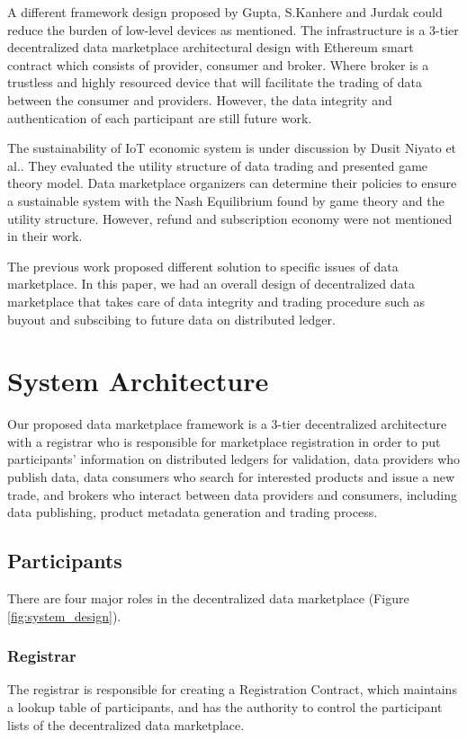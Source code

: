 \documentclass[journal,10pt,a4paper]{IEEEtran}
\begin{document}
A different framework design proposed by Gupta, S.Kanhere and Jurdak\cite{3tierDataMarket} could reduce the burden of low-level devices as mentioned. The infrastructure is a 3-tier decentralized data marketplace architectural design with Ethereum smart contract which consists of provider, consumer and broker. Where broker is a trustless and highly resourced device that will facilitate the trading of data between the consumer and providers. However, the data integrity and authentication of each participant are still future work.  

The sustainability of IoT economic system is under discussion by Dusit Niyato et al.\cite{UtilityStruct}. They evaluated the utility structure of data trading and presented game theory model.  Data marketplace organizers can determine their policies to ensure a sustainable system with the Nash Equilibrium found by game theory and the utility structure. However, refund and subscription economy were not mentioned in their work.

The previous work proposed different solution to specific issues of data marketplace. In this paper, we had an  overall design of decentralized data marketplace that takes care of data integrity and trading procedure such as buyout and subscibing to future data on distributed ledger.

\section{\normalsize\textbf{System Architecture}}
Our proposed data marketplace framework is a 3-tier decentralized architecture with a registrar who is responsible for marketplace registration in order to put participants' information on distributed ledgers for validation, data providers who publish data, data consumers who search for interested products and issue a new trade, and brokers who interact between data providers and consumers, including data publishing, product metadata generation and trading process.

\subsection{Participants}
There are four major roles in the decentralized data marketplace (Figure \ref{fig:system_design}).

\subsubsection{Registrar}
The registrar is responsible for creating a Registration Contract, which maintains a lookup table of participants, and has the authority to control the participant lists of the decentralized data marketplace. 
\end{document}
